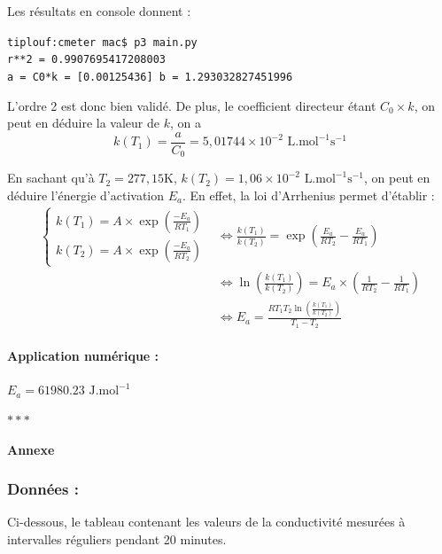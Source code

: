 \documentclass[14pt]{article}
\begin{document}
  Les résultats en console donnent :
	\begin{changemargin}{1cm}{0mm}
		\noindent
		\texttt{tiplouf:cmeter mac\$ p3 main.py}\\
		\noindent
		\texttt{r**2 = 0.9907695417208003}\\
		\noindent
		\texttt{a = C0*k = [0.00125436] b = 1.293032827451996}\\
	\end{changemargin}

  L'ordre 2 est donc bien validé. De plus, le coefficient directeur étant $C_0\times k$, on peut en déduire la valeur de $k$, on a
  \begin{equation}
    k(T_1)=\frac{a}{C_0}=5,01744\times 10^{-2}\text{ L.mol}^{-1}\text{s}^{-1}
  \end{equation}


  En sachant qu'à $T_2=277,15$K, $k(T_2)=1,06\times 10^{-2}\text{ L.mol}^{-1}\text{s}^{-1}$, on peut en déduire l'énergie d'activation $E_a$. En effet, la loi d'Arrhenius permet d'établir :
  \begin{align*}
    \begin{cases}
      k(T_1)=A\times\exp\left(\frac{-E_a}{RT_1}\right)\\
      k(T_2)=A\times\exp\left(\frac{-E_a}{RT_2}\right)
    \end{cases} & \Leftrightarrow \frac{k(T_1)}{k(T_2)}=\exp\left(\frac{E_a}{RT_2}-\frac{E_a}{RT_1}\right)\\
    & \Leftrightarrow \ln\left(\frac{k(T_1)}{k(T_2)}\right)=E_a\times \left(\frac{1}{RT_2}-\frac{1}{RT_1}\right)\\
    & \Leftrightarrow E_a = \frac{RT_1T_2\ln\left(\frac{k(T_1)}{k(T_2)}\right)}{T_1-T_2}
  \end{align*}

  \paragraph{Application numérique : } $\boxed{E_a=61980.23\text{ J.mol}^{-1}}$

  \begin{center}
    $\ast \ast \ast $
  \end{center}

  \newpage

  \begin{center}
		\textbf{\Large Annexe}
	\end{center}

  \subsubsection*{Données : } Ci-dessous, le tableau contenant les valeurs de la conductivité mesurées à intervalles réguliers pendant 20 minutes.
\end{document}

